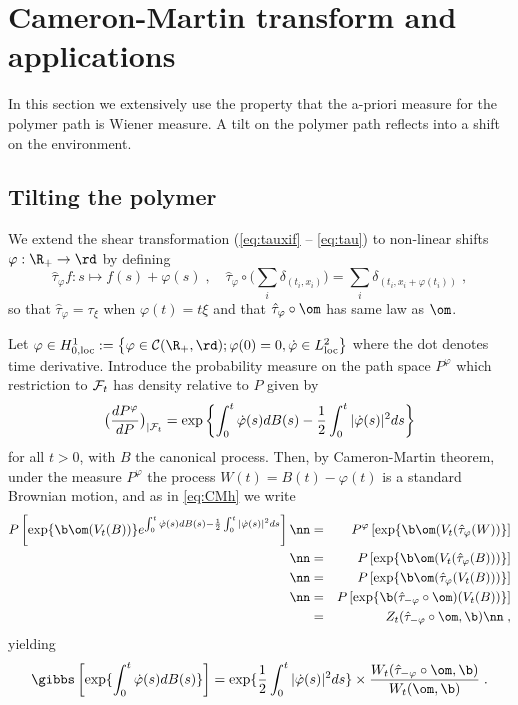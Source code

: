 \newcommand{\vpat}{\varphi_{a,t}}

 \chapter{Cameron-Martin transform and applications} \label{ch:CM}
 
 In this section we extensively use the property that the a-priori measure for the polymer path is Wiener measure. A tilt on the polymer path reflects into a shift on the environment. 
 
 \section{Tilting the polymer}
 
 We extend the shear transformation (\ref{eq:tauxif} -- \ref{eq:tau}) to non-linear shifts $\varphi: \R_+ \to \rd$ by defining 
 \begin{equation} \label{eq:htau}
\hat \tau_\varphi f : s \mapsto f(s)+\varphi(s) \;, \quad \hat \tau_\varphi \circ \big(\sum_i \delta_{(t_i, x_i)}\big) = \sum_i \delta_{(t_i, x_i+\varphi( t_i))} \;,
\end{equation}
so that $\hat \tau_\varphi=\tau_\xi$ when $\varphi(t)=t \xi$ and 
that $\hat \tau_\varphi \circ \om$ has same law as $\om$.
\medskip

Let $\varphi \in H_{0, {\rm loc}}^1:=\left\{ \varphi \in {\cal C}(\R_+,\rd); \varphi(0)=0, \dot \varphi \in L^2_{\rm loc} \right\}$  where the dot denotes time derivative.  
Introduce the probability measure on the path space $P^{\varphi}$ which restriction to ${\cal F}_t$ has density relative to $P$ given by
$$
\big(\frac{d P^{\varphi}}{d P}\big)_{| {\cal F}_t}= \exp \left\{ \int_0^t \dot \varphi (s) dB(s) - \frac{1}{2} \int_0^t |\dot \varphi(s)|^2 ds\right\}
$$
for all $t >0$,
with $B$ the canonical process. Then, by Cameron-Martin theorem, under the measure $P^{\varphi}$
the process $W(t)=B(t)-\varphi(t)$ is a standard Brownian motion, and as in \eqref{eq:CMh} we write
 \begin{eqnarray}
 P\left[ \exp \{ \b \om(V_t(B))\} e^{ \int_0^t \dot \varphi (s) dB(s) - \frac{1}{2} \int_0^t |\dot \varphi(s)|^2 ds}
  \right] 
\nn &=& P^\varphi \left[ \exp \{ \b \om(V_t(\hat \tau_{\varphi}(W))\}\right] \\
\nn &=& P\left[ \exp \{ \b \om(V_t(\hat \tau_{\varphi}(B)))\}\right] \\
\nn &=& P\left[ \exp \{ \b \om(\hat \tau_{\varphi} (V_t (B)))\}\right] \\
\nn &=& P\left[ \exp \{ \b (\hat \tau_{-\varphi} \circ \om)(V_t(B))\}\right] \\
&=&   Z_t(\hat \tau_{-\varphi} \circ \om,\b) \nn \;,
\end{eqnarray}
yielding
\begin{equation} \label{eq:CMphi}
\gibbs \left[ \exp \{  \int_0^t \dot \varphi (s) dB(s) \}
  \right] = \exp\{ \frac{1}{2} \int_0^t |\dot \varphi(s)|^2 ds\} \times \frac{ W_t(\hat \tau_{-\varphi} \circ \om,\b)}{ W_t( \om,\b)} \;.
\end{equation}
